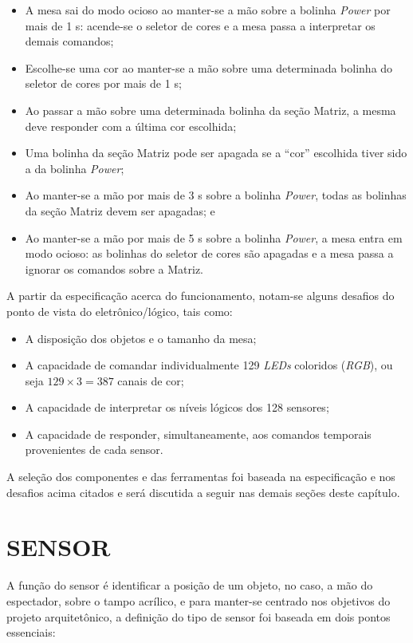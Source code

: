 \begin{itemize}[noitemsep]
    \item A mesa sai do modo ocioso ao manter-se a mão sobre a bolinha \emph{Power} por mais de {1 s}: acende-se o seletor de cores e a mesa passa a interpretar os demais comandos;
    \item Escolhe-se uma cor ao manter-se a mão sobre uma determinada bolinha do seletor de cores por mais de {1 s};
    \item Ao passar a mão sobre uma determinada bolinha da seção Matriz, a mesma deve responder com a última cor escolhida;
    \item Uma bolinha da seção Matriz pode ser apagada se a ``cor'' escolhida tiver sido a da bolinha \emph{Power};
    \item Ao manter-se a mão por mais de {3 s} sobre a bolinha \emph{Power}, todas as bolinhas da seção Matriz devem ser apagadas; e
    \item Ao manter-se a mão por mais de {5 s} sobre a bolinha \emph{Power}, a mesa entra em modo ocioso: as bolinhas do seletor de cores são apagadas e a mesa passa a ignorar os comandos sobre a Matriz.
\end{itemize}

A partir da especificação acerca do funcionamento, notam-se alguns desafios do ponto de vista do eletrônico/lógico, tais como:

\begin{itemize}
    \item A disposição dos objetos e o tamanho da mesa;
    \item A capacidade de comandar individualmente 129 \emph{LEDs} coloridos (\emph{RGB}), ou seja $129 \times 3 = 387$ canais de cor;
    \item A capacidade de interpretar os níveis lógicos dos 128 sensores;
    \item A capacidade de responder, simultaneamente, aos comandos temporais provenientes de cada sensor.
\end{itemize}

A seleção dos componentes e das ferramentas foi baseada na especificação e nos desafios acima citados e será discutida a seguir nas demais seções deste capítulo.

\section{SENSOR}
\label{sec:sensor}

A função do sensor é identificar a posição de um objeto, no caso, a mão do espectador, sobre o tampo acrílico, e para manter-se centrado nos objetivos do projeto arquitetônico, a definição do tipo de sensor foi baseada em dois pontos essenciais:


